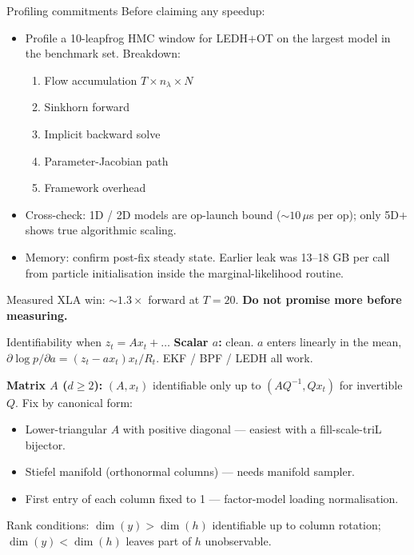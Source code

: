 \documentclass[10pt,aspectratio=169]{beamer}
\begin{document}
\begin{frame}{Profiling commitments}
  Before claiming any speedup:
  \begin{itemize}
    \item Profile a 10-leapfrog HMC window for LEDH$+$OT on the largest model in the benchmark set. Breakdown:
    \begin{enumerate}
      \item Flow accumulation $T \times n_\lambda \times N$
      \item Sinkhorn forward
      \item Implicit backward solve
      \item Parameter-Jacobian path
      \item Framework overhead
    \end{enumerate}
    \item Cross-check: 1D / 2D models are op-launch bound ($\sim 10\,\mu$s per op); only 5D$+$ shows true algorithmic scaling.
    \item Memory: confirm post-fix steady state. Earlier leak was 13--18 GB per call from particle initialisation inside the marginal-likelihood routine.
  \end{itemize}

  \medskip
  Measured XLA win: $\sim 1.3\times$ forward at $T{=}20$. \textbf{Do not promise more before measuring.}
\end{frame}

\begin{frame}{Identifiability when $z_t = A x_t + \dots$}
  \textbf{Scalar $a$:} clean. $a$ enters linearly in the mean, $\partial\!\log p/\partial a = (z_t - a x_t) x_t / R_t$. EKF / BPF / LEDH all work.

  \medskip
  \textbf{Matrix $A$ ($d \ge 2$):} $(A, x_t)$ identifiable only up to $(A Q^{-1}, Q x_t)$ for invertible $Q$. Fix by canonical form:
  \begin{itemize}
    \item Lower-triangular $A$ with positive diagonal --- easiest with a fill-scale-triL bijector.
    \item Stiefel manifold (orthonormal columns) --- needs manifold sampler.
    \item First entry of each column fixed to 1 --- factor-model loading normalisation.
  \end{itemize}

  \medskip
  Rank conditions: $\dim(y) > \dim(h)$ identifiable up to column rotation; $\dim(y) < \dim(h)$ leaves part of $h$ unobservable.
\end{frame}
\end{document}
